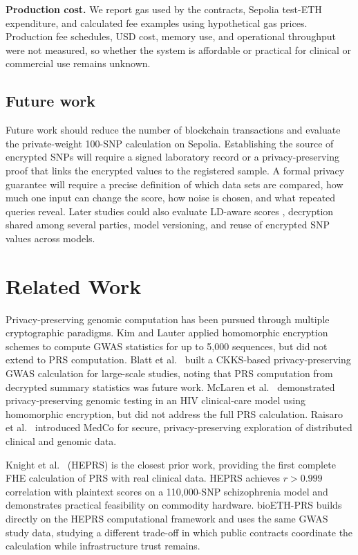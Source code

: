 \documentclass[10pt]{article}
\begin{document}
\textbf{Production cost.}
We report gas used by the contracts, Sepolia test-ETH expenditure, and calculated fee
examples using hypothetical gas prices.  Production fee schedules, USD cost, memory
use, and operational throughput were not measured, so whether the system is affordable
or practical for clinical or commercial use remains unknown.

\subsection{Future work}

Future work should reduce the number of blockchain transactions and evaluate the
private-weight 100-SNP calculation on Sepolia.  Establishing the source of encrypted
SNPs will require a signed laboratory record or a privacy-preserving proof that links
the encrypted values to the registered sample.  A formal privacy guarantee will require
a precise definition of which data sets are compared, how much one input can change the
score, how noise is chosen, and what repeated queries reveal.  Later studies could also
evaluate LD-aware scores \citep{prive2020ldpred2}, decryption shared among several parties, model versioning,
and reuse of encrypted SNP values across models.

\section{Related Work}
\label{sec:related}

Privacy-preserving genomic computation has been pursued through multiple
cryptographic paradigms.  Kim and Lauter \citep{kim2015} applied homomorphic
encryption schemes to compute GWAS statistics for up to 5,000 sequences, but did not
extend to PRS computation.  Blatt et al.\ \citep{blatt2020} built a CKKS-based
privacy-preserving GWAS calculation for large-scale studies, noting that PRS
computation from decrypted summary statistics was future work.  McLaren et al.\
\citep{mclaren2016} demonstrated privacy-preserving genomic testing in an HIV
clinical-care model using homomorphic encryption, but did not address the full PRS
calculation.  Raisaro et al.\ \citep{raisaro2019} introduced MedCo for secure,
privacy-preserving exploration of distributed clinical and genomic data.

Knight et al.\ \citep{knight2026heprs} (HEPRS) is the closest prior work, providing
the first complete FHE calculation of PRS with real clinical data.  HEPRS achieves
$r > 0.999$ correlation with plaintext scores on a 110,000-SNP schizophrenia
model and demonstrates practical feasibility on commodity hardware.  bioETH-PRS
builds directly on the HEPRS computational framework and uses the same GWAS study
data, studying a different trade-off in which public contracts coordinate the
calculation while infrastructure trust remains.
\end{document}
